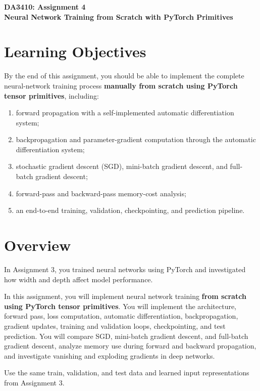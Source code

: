 \documentclass[11pt,a4paper]{article}
\begin{document}
\begin{center}
    {\LARGE \textbf{DA3410: Assignment 4}}\\[0.4em]
    {\Large \textbf{Neural Network Training from Scratch with PyTorch Primitives}}\\[1em]
\end{center}

\section{Learning Objectives}

By the end of this assignment, you should be able to implement the complete neural-network training process \textbf{manually from scratch using PyTorch tensor primitives}, including:

\begin{enumerate}
    \item forward propagation with a self-implemented automatic differentiation system;
    \item backpropagation and parameter-gradient computation through the automatic differentiation system;
    \item stochastic gradient descent (SGD), mini-batch gradient descent, and full-batch gradient descent;
    \item forward-pass and backward-pass memory-cost analysis;
    \item an end-to-end training, validation, checkpointing, and prediction pipeline.
\end{enumerate}

\section{Overview}

In Assignment 3, you trained neural networks using PyTorch and investigated how width and depth affect model performance.

In this assignment, you will implement neural network training \textbf{from scratch using PyTorch tensor primitives}. You will implement the architecture, forward pass, loss computation, automatic differentiation, backpropagation, gradient updates, training and validation loops, checkpointing, and test prediction. You will compare SGD, mini-batch gradient descent, and full-batch gradient descent, analyze memory use during forward and backward propagation, and investigate vanishing and exploding gradients in deep networks.

Use the same train, validation, and test data and learned input representations from Assignment 3.
\end{document}
